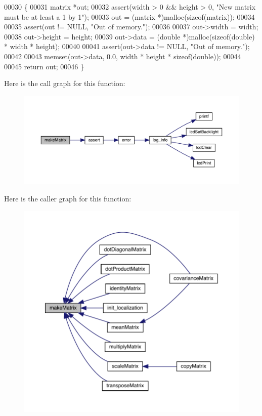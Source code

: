 \begin{DoxyCode}
00030                                           \{
00031   matrix *out;
00032   assert(width > 0 && height > 0, \textcolor{stringliteral}{"New matrix must be at least a 1 by 1"});
00033   out = (matrix *)malloc(\textcolor{keyword}{sizeof}(matrix));
00034 
00035   assert(out != NULL, \textcolor{stringliteral}{"Out of memory."});
00036 
00037   out->width = width;
00038   out->height = height;
00039   out->data = (\textcolor{keywordtype}{double} *)malloc(\textcolor{keyword}{sizeof}(\textcolor{keywordtype}{double}) * width * height);
00040 
00041   assert(out->data != NULL, \textcolor{stringliteral}{"Out of memory."});
00042 
00043   memset(out->data, 0.0, width * height * \textcolor{keyword}{sizeof}(\textcolor{keywordtype}{double}));
00044 
00045   \textcolor{keywordflow}{return} out;
00046 \}
\end{DoxyCode}
Here is the call graph for this function\+:
\nopagebreak
\begin{figure}[H]
\begin{center}
\leavevmode
\includegraphics[width=350pt]{matrix_8h_aae8b56c6fb44d9147b835f4006ca872c_cgraph}
\end{center}
\end{figure}
Here is the caller graph for this function\+:
\nopagebreak
\begin{figure}[H]
\begin{center}
\leavevmode
\includegraphics[width=350pt]{matrix_8h_aae8b56c6fb44d9147b835f4006ca872c_icgraph}
\end{center}
\end{figure}
